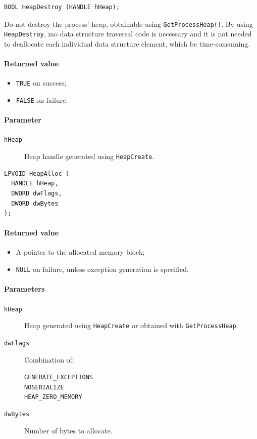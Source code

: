 \begin{verbatim}
BOOL HeapDestroy (HANDLE hHeap);
\end{verbatim}
Do not destroy the process' heap, obtainable using \texttt{GetProcessHeap()}. By using \texttt{HeapDestroy}, mo data structure traversal code is necessary and it is not needed to deallocate each individual data structure element, which be time-consuming.

\paragraph{Returned value}
\begin{itemize}
\item \texttt{TRUE} on success;
\item \texttt{FALSE} on failure.
\end{itemize}

\paragraph{Parameter}
\begin{description}
\item [\texttt{hHeap}] Heap handle generated using \texttt{HeapCreate}.
\end{description}

\begin{verbatim}
LPVOID HeapAlloc (
  HANDLE hHeap,
  DWORD dwFlags,
  DWORD dwBytes
);
\end{verbatim}

\paragraph{Returned value}
\begin{itemize}
\item A pointer to the allocated memory block;
\item \texttt{NULL} on failure, unless exception generation is specified.
\end{itemize}

\paragraph{Parameters}
\begin{description}
\item [\texttt{hHeap}] Heap generated using \texttt{HeapCreate} or obtained with \texttt{GetProcessHeap}.
\item [\texttt{dwFlags}] Combination of:
\begin{description}
\item [\texttt{GENERATE\_EXCEPTIONS}]
\item [\texttt{NO\-SERIALIZE}]
\item [\texttt{HEAP\_ZERO\_MEMORY}]
\end{description}
\item [\texttt{dwBytes}] Number of bytes to allocate.
\end{description}

